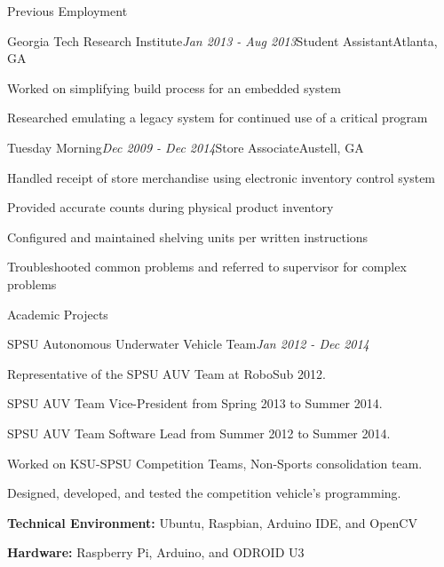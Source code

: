 \documentclass[11pt]{resume} %
\begin{document}
\begin{rSection}{Previous Employment}

\begin{rSubsection}{Georgia Tech Research Institute}{\em Jan 2013 - Aug 2013}{Student Assistant}{Atlanta, GA}
\item Worked on simplifying build process for an embedded system
\item Researched emulating a legacy system for continued use of a critical program
\end{rSubsection}

\begin{rSubsection}{Tuesday Morning}{\em Dec 2009 - Dec 2014}{Store Associate}{Austell, GA}
\item Handled receipt of store merchandise using electronic inventory control system
\item Provided accurate counts during physical product inventory
\item Configured and maintained shelving units per written instructions
\item Troubleshooted common problems and referred to supervisor for complex problems
\end{rSubsection}

\end{rSection}


\begin{rSection}{Academic Projects}

\begin{rSubsection}{SPSU Autonomous Underwater Vehicle Team}{\em Jan 2012 - Dec 2014}{}{}

\item Representative of the SPSU AUV Team at RoboSub 2012.
\item SPSU AUV Team Vice-President from Spring 2013 to Summer 2014.
\item SPSU AUV Team Software Lead from Summer 2012 to Summer 2014.
\item Worked on KSU-SPSU Competition Teams, Non-Sports consolidation team.
\item Designed, developed, and tested the competition vehicle's programming.
\item \textbf{Technical Environment:} Ubuntu, Raspbian, Arduino IDE, and OpenCV
\item \textbf{Hardware:} Raspberry Pi, Arduino, and ODROID U3
\end{rSubsection}

\end{rSection}
\end{document}
